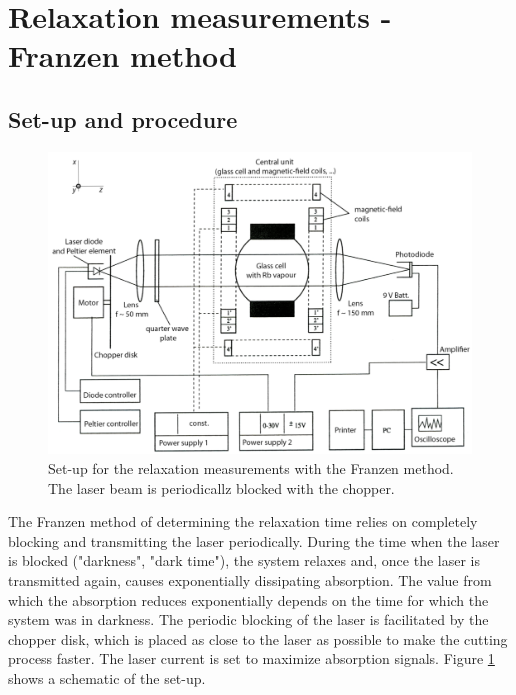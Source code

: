 \section{Relaxation measurements - Franzen method}
\subsection{Set-up and procedure}
\begin{figure}
\centering
\includegraphics[width=1.0\linewidth]{graphics/franzensetup}
\caption[Set-up relaxation measurements - Franzen]{Set-up for the relaxation measurements with the Franzen method. The laser beam is periodicallz blocked with the chopper. \cite{anleitung}}
\label{fig:franzensetup}
\end{figure}
The Franzen method of determining the relaxation time relies on completely blocking and transmitting the laser periodically. During the time when the laser is blocked ("darkness", "dark time"), the system relaxes and, once the laser is transmitted again, causes exponentially dissipating absorption. The value from which the absorption reduces exponentially depends on the time for which the system was in darkness. The periodic blocking of the laser is facilitated by the chopper disk, which is placed as close to the laser as possible to make the cutting process faster. The laser current is set to maximize absorption signals. Figure \ref{fig:franzensetup} shows a schematic of the set-up.

